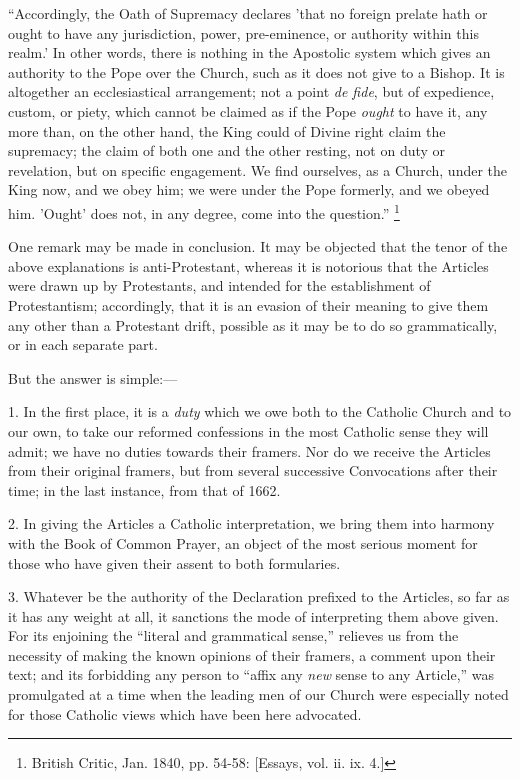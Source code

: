 ``Accordingly, the Oath of Supremacy declares 'that no foreign
prelate hath or ought to have any jurisdiction, power, pre-eminence,
or authority within this realm.' In other words, there is nothing in
the Apostolic system which gives an authority to the Pope over the
Church, such as it does not give to a Bishop. It is altogether an
ecclesiastical arrangement; not a point \emph{de fide}, but of
expedience, custom, or piety, which cannot be claimed as if the Pope \emph{ought}
to have it, any more than, on the other hand, the King could of
Divine right claim the supremacy; the claim of both one and the other
resting, not on duty or revelation, but on specific engagement. We
find ourselves, as a Church, under the King now, and we obey him; we
were under the Pope formerly, and we obeyed him. 'Ought' does not, in
any degree, come into the question.'' \footnote{British Critic, Jan. 1840, pp. 54-58:
[Essays, vol. ii. ix. 4.]}


One remark may be made in conclusion. It may be objected that the
tenor of the above explanations is anti-Protestant, whereas it is
notorious that the Articles were drawn up by Protestants, and intended
for the establishment of Protestantism; accordingly, that it is an
evasion of their meaning to give them any other than a Protestant
drift, possible as it may be to do so grammatically, or in each
separate part.

But the answer is simple:—

1. In the first place, it is a \emph{duty} which we owe both to the
Catholic Church and to our own, to take our reformed confessions in
the most Catholic sense they will admit; we have no duties towards
their framers. Nor do we receive the Articles from their original
framers, but from several successive Convocations after their time; in
the last instance, from that of 1662.

2. In giving the Articles a Catholic interpretation, we bring them
into harmony with the Book of Common Prayer, an object of the most
serious moment for those who have given their assent to both
formularies.

3. Whatever be the authority of the Declaration prefixed to the
Articles, so far as it has any weight at all, it sanctions the mode of
interpreting them above given. For its enjoining the ``literal and
grammatical sense,'' relieves us from the necessity of making the
known opinions of their framers, a comment upon their text; and its
forbidding any person to ``affix any \emph{new} sense to any
Article,'' was promulgated at a time when the leading men of our
Church were especially noted for those Catholic views which have been
here advocated.

